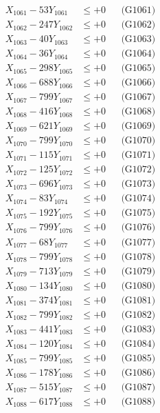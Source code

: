 \documentclass[a4paper,10pt]{article}
\begin{document}
{\begin{align}
\allowbreak
X_{1061} - 53Y_{1061} &\leq +0 && \text{(G1061)} \\
X_{1062} - 247Y_{1062} &\leq +0 && \text{(G1062)} \\
X_{1063} - 40Y_{1063} &\leq +0 && \text{(G1063)} \\
X_{1064} - 36Y_{1064} &\leq +0 && \text{(G1064)} \\
X_{1065} - 298Y_{1065} &\leq +0 && \text{(G1065)} \\
X_{1066} - 688Y_{1066} &\leq +0 && \text{(G1066)} \\
X_{1067} - 799Y_{1067} &\leq +0 && \text{(G1067)} \\
X_{1068} - 416Y_{1068} &\leq +0 && \text{(G1068)} \\
X_{1069} - 621Y_{1069} &\leq +0 && \text{(G1069)} \\
X_{1070} - 799Y_{1070} &\leq +0 && \text{(G1070)} \\
\allowbreak
X_{1071} - 115Y_{1071} &\leq +0 && \text{(G1071)} \\
X_{1072} - 125Y_{1072} &\leq +0 && \text{(G1072)} \\
X_{1073} - 696Y_{1073} &\leq +0 && \text{(G1073)} \\
X_{1074} - 83Y_{1074} &\leq +0 && \text{(G1074)} \\
X_{1075} - 192Y_{1075} &\leq +0 && \text{(G1075)} \\
X_{1076} - 799Y_{1076} &\leq +0 && \text{(G1076)} \\
X_{1077} - 68Y_{1077} &\leq +0 && \text{(G1077)} \\
X_{1078} - 799Y_{1078} &\leq +0 && \text{(G1078)} \\
X_{1079} - 713Y_{1079} &\leq +0 && \text{(G1079)} \\
X_{1080} - 134Y_{1080} &\leq +0 && \text{(G1080)} \\
\allowbreak
X_{1081} - 374Y_{1081} &\leq +0 && \text{(G1081)} \\
X_{1082} - 799Y_{1082} &\leq +0 && \text{(G1082)} \\
X_{1083} - 441Y_{1083} &\leq +0 && \text{(G1083)} \\
X_{1084} - 120Y_{1084} &\leq +0 && \text{(G1084)} \\
X_{1085} - 799Y_{1085} &\leq +0 && \text{(G1085)} \\
X_{1086} - 178Y_{1086} &\leq +0 && \text{(G1086)} \\
X_{1087} - 515Y_{1087} &\leq +0 && \text{(G1087)} \\
X_{1088} - 617Y_{1088} &\leq +0 && \text{(G1088)} \\

\end{align}}
\end{document}
